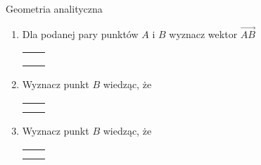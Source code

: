 \documentclass[12pt,a4paper]{article}
\begin{document}
	\begin{center}
		\LARGE Geometria analityczna
	\end{center}
	\vspace{1.5cm}
	
	\begin{enumerate}[1.]
		\item Dla podanej pary punktów $A$ i $B$ wyznacz wektor $\overrightarrow{AB}$
		
		\begin{enumerate}[a)] \begin{tabular}{p{7cm} p{7cm}}
				\item $A=(-5,3)$, $B=(7,2)$& \item $A=(3,7)$, $B=(8,12)$ \\
				\item $A=(-4,0)$, $B=(1,-6)$& \item $A=(-12,6)$, $B=(8,-6)$ \\
				\item $A=(-11,5)$, $B=(22,1)$& \item $A=(-9,6)$, $B=(-4,-11)$ \\
	 	\end{tabular} \end{enumerate}
 	
 	\item Wyznacz punkt $B$ wiedząc, że
 	
 		\begin{enumerate}[a)] \begin{tabular}{p{7cm} p{7cm}}
 			\item $A=(-1,2)$, $\overrightarrow{AB}=[ 3,6 ]$ & \item $A=(0,-2)$, $\overrightarrow{AB}=[3,5]$ \\
 			\item $A=(-5,5)$, $\overrightarrow{AB}=[ 3,4 ]$ & \item $A=(-2,1)$, $\overrightarrow{AB}=[-1,-9]$ \\
 		\end{tabular} \end{enumerate}
 	
 	 	\item Wyznacz punkt $B$ wiedząc, że
 	
 	\begin{enumerate}[a)] \begin{tabular}{p{7cm} p{7cm}}
 			\item $A=(8,9)$, $\overrightarrow{BA}=[ -3,-6 ]$ & \item $A=(-1,3)$, $\overrightarrow{BA}=[-2,-4]$ \\
 			\item $A=(5,-3)$, $\overrightarrow{BA}=[ -6,1 ]$ & \item $A=(8,-7)$, $\overrightarrow{BA}=[2,-8]$ \\
 	\end{tabular} \end{enumerate}
 

\end{enumerate}
\end{document}
